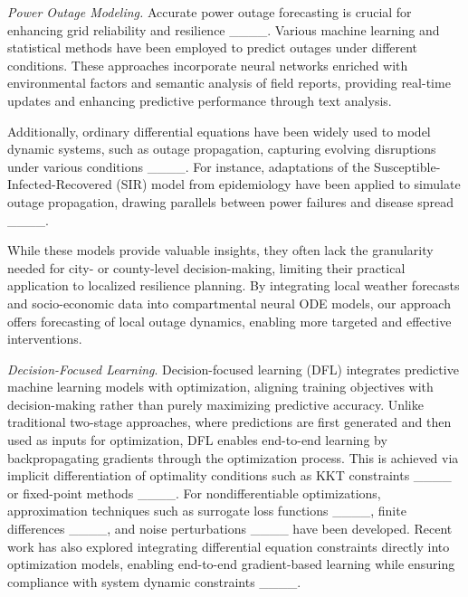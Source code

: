 \vspace{.05in}
\noindent\emph{Power Outage Modeling.}
Accurate power outage forecasting is crucial for enhancing grid reliability and resilience ____. Various machine learning and statistical methods have been employed to predict outages under different conditions. 
These approaches incorporate neural networks enriched with environmental factors and semantic analysis of field reports, providing real-time updates and enhancing predictive performance through text analysis.

Additionally, ordinary differential equations have been widely used to model dynamic systems, such as outage propagation, capturing evolving disruptions under various conditions ____. For instance, adaptations of the Susceptible-Infected-Recovered (SIR) model from epidemiology have been applied to simulate outage propagation, drawing parallels between power failures and disease spread ____.

While these models provide valuable insights, they often lack the granularity needed for city- or county-level decision-making, limiting their practical application to localized resilience planning. By integrating local weather forecasts and socio-economic data into compartmental neural ODE models, our approach offers forecasting of local outage dynamics, enabling more targeted and effective interventions.

\vspace{.05in}
\noindent\emph{Decision-Focused Learning}.
Decision-focused learning (DFL) integrates predictive machine learning models with optimization, aligning training objectives with decision-making rather than purely maximizing predictive accuracy. Unlike traditional two-stage approaches, where predictions are first generated and then used as inputs for optimization, DFL enables end-to-end learning by backpropagating gradients through the optimization process. This is achieved via implicit differentiation of optimality conditions such as KKT constraints ____ or fixed-point methods ____. For nondifferentiable optimizations, approximation techniques such as surrogate loss functions ____, finite differences ____, and noise perturbations ____ have been developed. Recent work has also explored integrating differential equation constraints directly into optimization models, enabling end-to-end gradient-based learning while ensuring compliance with system dynamic constraints ____.

